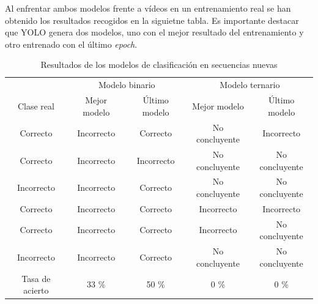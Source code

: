 \documentclass[12pt]{report} %
\begin{document}
    
    Al enfrentar ambos modelos frente a vídeos en un entrenamiento real se han
    obtenido los resultados recogidos en la siguietne tabla. Es importante
    destacar que YOLO genera dos modelos, uno con el mejor resultado del
    entrenamiento y otro entrenado con el último \textit{epoch}.

    \begin{table}[H]
        \center
        \begin{tabular}{@{}ccccc@{}}
            \toprule
             & \multicolumn{2}{c}{Modelo binario} & \multicolumn{2}{c}{Modelo ternario} \\
            \cmidrule(lr){2-3} \cmidrule(l){4-5}
            Clase real & Mejor modelo & Último modelo & Mejor modelo & Último modelo \\
            \midrule
            Correcto   & Incorrecto & Correcto   & No concluyente & Incorrecto \\
            Correcto   & Incorrecto & Incorrecto & No concluyente & No concluyente \\
            Incorrecto & Incorrecto & Correcto   & No concluyente & No concluyente \\
            Correcto   & Incorrecto & Correcto   & Incorrecto     & Incorrecto \\
            Correcto   & Incorrecto & Correcto   & Incorrecto     & No concluyente \\
            Incorrecto & Incorrecto & Correcto   & No concluyente & No concluyente \\
            \midrule
            Tasa de acierto & 33 \% & 50 \% & 0 \% & 0 \% \\
            \bottomrule
        \end{tabular}
        \caption{Resultados de los modelos de clasificación en secuencias nuevas}
    \end{table}
\end{document}
